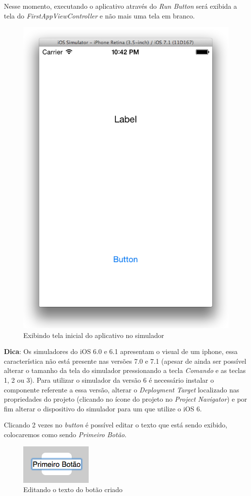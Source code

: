 \documentclass[a4paper,12pt,brazil,doubleside]{book}
\begin{document}
\begin{singlespace}
Nesse momento, executando o aplicativo através do \emph{Run Button} será exibida a tela do \emph{FirstAppViewController} e não mais uma tela em branco.

\begin{figure}[H]
  \centering
  \includegraphics[width=.55\textwidth]{figuras/3/tela_novo_projeto_18.png}
  \caption{Exibindo tela inicial do aplicativo no simulador}
  \label{fig:a}
\end{figure}

\begin{framed}

\textbf{Dica}: Os simuladores do iOS 6.0 e 6.1 apresentam o visual de um iphone, essa característica não está presente nas versões 7.0 e 7.1 (apesar de ainda ser possível alterar o tamanho da tela do simulador pressionando a tecla \textit{Comando} e as teclas 1, 2 ou 3). Para utilizar o simulador da versão 6 é necessário instalar o componente referente a essa versão, alterar o \textit{Deployment Target} localizado nas propriedades do projeto (clicando no ícone do projeto no \textit{Project Navigator}) e por fim alterar o dispositivo do simulador para um que utilize o iOS 6.\end{framed}


Clicando 2 vezes no \emph{button} é possível editar o texto que está sendo exibido, colocaremos como sendo \emph{Primeiro Botão}.

\begin{figure}[H]
  \centering
  \includegraphics[scale=1]{figuras/3/tela_novo_projeto_20.png}
  \caption{Editando o texto do botão criado}
  \label{fig:a}
\end{figure}


\end{singlespace}
\end{document}
